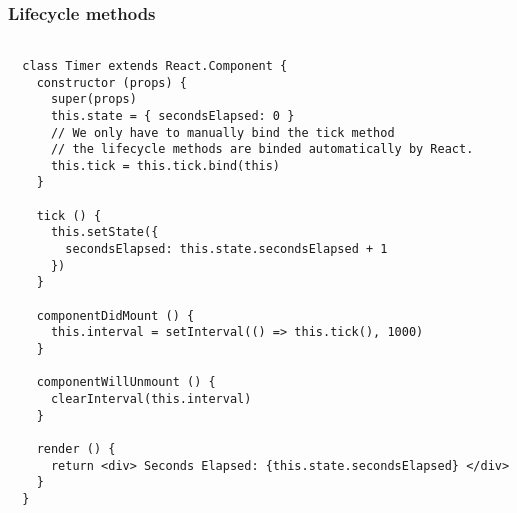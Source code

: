 \begin{frame}[fragile]

  \frametitle{Lifecycle methods}

  \begin{verbatim}

  class Timer extends React.Component {
    constructor (props) {
      super(props)
      this.state = { secondsElapsed: 0 }
      // We only have to manually bind the tick method
      // the lifecycle methods are binded automatically by React.
      this.tick = this.tick.bind(this)
    }

    tick () {
      this.setState({
        secondsElapsed: this.state.secondsElapsed + 1
      })
    }

    componentDidMount () {
      this.interval = setInterval(() => this.tick(), 1000)
    }

    componentWillUnmount () {
      clearInterval(this.interval)
    }

    render () {
      return <div> Seconds Elapsed: {this.state.secondsElapsed} </div>
    }
  }

  \end{verbatim}

\end{frame}

